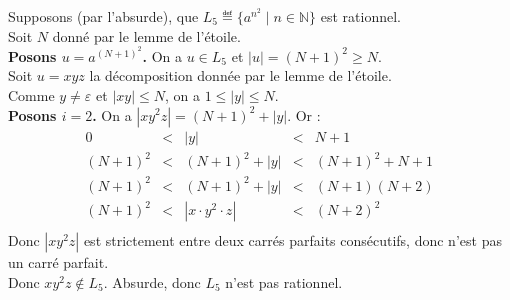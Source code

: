 \begin{corrections}
\begin{questions}
  \item Supposons (par l'absurde), que $L_5 \eqdef \{a^{n^2}\mid n\in\mathbb{N}\}$ est rationnel.\\
    Soit $N$ donné par le lemme de l'étoile. \\
    \textbf{Posons $u=a^{(N+1)^2}$.} On a $u\in L_5$ et $|u|=(N+1)^2\ge N$.\\
    Soit $u=xyz$ la décomposition donnée par le lemme de l'étoile.\\
    Comme $y\neq\varepsilon$ et $|xy|\le N$, on a $1\le |y|\le N$.\\
    \textbf{Posons $i=2$.} On a $|xy^2z| = (N+1)^2 + |y|$.
    Or :
    $$\begin{array}{rcccl}
      0 &<& |y| &<& N+1\\
      (N+1)^2 &<& (N+1)^2 + |y| & < & (N+1)^2 + N+1\\
      (N+1)^2 &<& (N+1)^2 + |y| & < &  (N+1)(N+2)\\
      (N+1)^2 &<& |x\cdot y^2 \cdot z| & < & (N+2)^2\\
    \end{array}$$
    Donc $|xy^2z|$ est strictement entre deux carrés parfaits consécutifs, donc n'est pas un carré parfait.\\
    Donc $xy^2z \notin L_5$. Absurde, donc $L_5$ n'est pas rationnel.

  \end{questions}

\end{corrections}

\endgroup
\endinput

